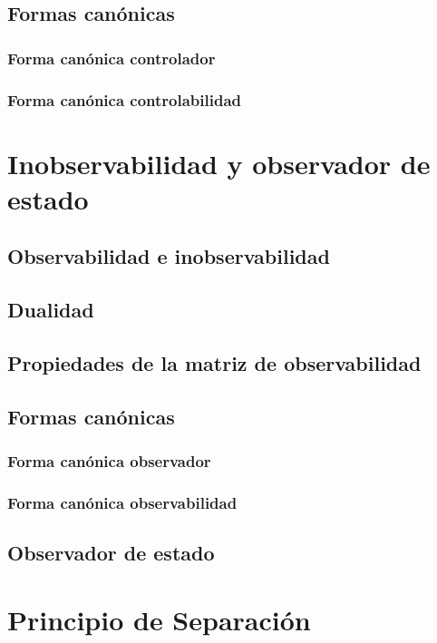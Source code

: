 \subsection{Formas canónicas}
\subsubsection{Forma canónica controlador}
\subsubsection{Forma canónica controlabilidad}

\newpage
\section{Inobservabilidad y observador de estado}
\subsection{Observabilidad e inobservabilidad}
\subsection{Dualidad}
\subsection{Propiedades de la matriz de observabilidad}
\subsection{Formas canónicas}
\subsubsection{Forma canónica observador}
\subsubsection{Forma canónica observabilidad}
\subsection{Observador de estado}

\newpage
\section{Principio de Separación}
